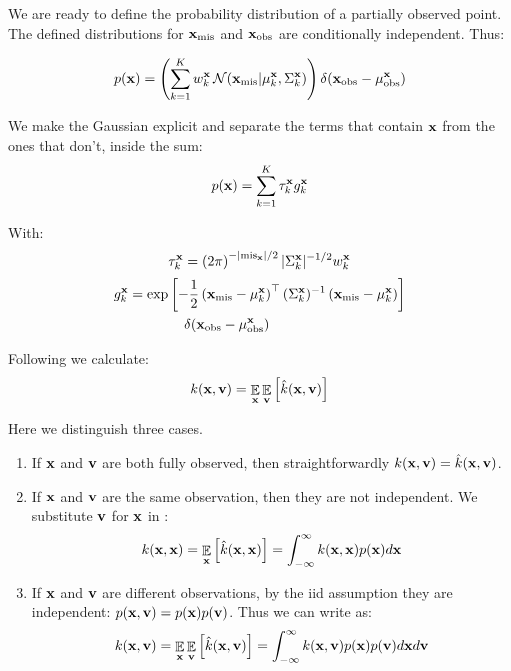 \documentclass[letterpaper]{article}
\DeclareMathOperator*{\E}{\Ex}
\newcommand{\Ex}{\mathbb{E}}
\newcommand{\tp}{\top}
\newcommand{\vx}{{\bf x}}
\newcommand{\vv}{{\bf v}}
\newcommand{\misx}{{\text{mis}_\vx}}
\begin{document}
We are ready to define the probability distribution of a partially observed
point. The defined distributions for $\vx_\text{mis}$ and $\vx_\text{obs}$ are
conditionally independent. Thus:

\begin{equation}
p(\vx) = \left(\sum_{k=1}^K w_k^\vx \, \mathcal{N}(\vx_\text{mis}| \mu^\vx_k,
  \Sigma^\vx_k)\right) \delta(\vx_\text{obs}-\mu^\vx_\text{obs})
\label{eq:pdf-partially-observed-long}
\end{equation}

We make the Gaussian explicit and separate the terms that contain $\vx$ from the
ones that don't, inside the sum:
\begin{equation}
p(\vx) = \sum_{k=1}^K \tau_k^\vx g_k^\vx
\label{eq:pdf-partially-observed}
\end{equation}

With:
\begin{equation*}
\tau_k^\vx = \left(2\pi\right)^{-|\misx|/2} |\Sigma_k^\vx|^{-1/2}w_k^\vx
\end{equation*}
\begin{equation*}
  \begin{aligned}
g_k^\vx &= \exp\left[-\frac{1}{2}\left(\vx_\text{mis} -
    \mu_k^\vx\right)^\tp(\Sigma_k^\vx)^{-1}\left(\vx_\text{mis} - \mu_k^\vx\right)\right] \\
&\hspace{4em} \delta(\vx_\text{obs}-\mu^\vx_\text{obs})
  \end{aligned}
\end{equation*}

Following  we calculate:
\begin{equation}
  k(\vx, \vv) = \E_\vx \E_\vv \left[ \hat{k}(\vx, \vv) \right]
  \label{eq:expect-kernel}
\end{equation}

Here we distinguish three cases.
\begin{enumerate}
\item If $\vx$ and $\vv$ are both fully observed, then straightforwardly $k(\vx,
\vv) = \hat{k}(\vx, \vv)$.

\item If $\vx$ and $\vv$ are the same observation, then they are not
  independent. We substitute $\vv$ for $\vx$ in :
\begin{equation}
  k(\vx, \vx) = \E_\vx \left[\hat{k}(\vx, \vx) \right] = \int_{-\infty}^\infty
k(\vx, \vx) p(\vx) d\vx
  \label{eq:same-inputs}
\end{equation}

\item If $\vx$ and $\vv$ are different observations, by
the \ac{iid} assumption they are independent: $p(\vx, \vv) = p(\vx)p(\vv)$. Thus
we can write  as:
\begin{equation}
  k(\vx, \vv) = \E_\vx \E_\vv \left[ \hat{k}(\vx, \vv) \right] = 
  \int_{-\infty}^\infty k(\vx, \vv) p(\vx) p(\vv) d\vx d\vv
  \label{eq:independent-inputs}
\end{equation}
\end{enumerate}
\end{document}
